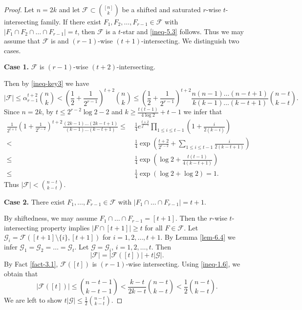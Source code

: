 \documentclass[11pt,a4paper]{article}
\newtheorem{false statement}{False statement}
\theoremstyle{definition}
\def\hf{\mathcal{F}}
\def\hg{\mathcal{G}}
\begin{document}
\begin{proof}
Let $n=2k$ and let $\hf\subset \binom{[n]}{k}$ be a shifted and saturated $r$-wise $t$-intersecting family. If there exist $F_1,F_2,\ldots,F_{r-1}\in \hf$ with $|F_1\cap F_2\cap \ldots \cap F_{r-1}|=t$, then $\hf$ is a $t$-star and \eqref{ineq-5.3} follows. Thus we may assume that $\hf$ is and $(r-1)$-wise $(t+1)$-intersecting.  We distinguish two cases.

\vspace{3pt}
{\noindent\bf Case 1.} $\hf$ is $(r-1)$-wise $(t+2)$-intersecting.
\vspace{3pt}

Then by  \eqref{ineq-key3} we have
\[
 |\hf|\leq \alpha_{r-1}^{t+2}\binom{n}{k}<\left(\frac{1}{2}+\frac{1}{2^{r-1}}\right)^{t+2}\binom{n}{k}\leq \left(\frac{1}{2}+\frac{1}{2^{r-1}}\right)^{t+2}\frac{n(n-1)\ldots(n-t+1)}{k(k-1)\ldots(k-t+1)}\binom{n-t}{k-t}.
\]
Since $n=2k$, by $t\leq 2^{r-2}\log 2 -2$ and $k\geq  \frac{t(t-1)}{4\log 2} +t-1$ we infer that
\begin{align*}
\frac{1}{2^{t+1}}\left(1+\frac{1}{2^{r-2}}\right)^{t+2}\frac{(2k-1)\ldots(2k-t+1)}{(k-1)\ldots(k-t+1)}
\leq \  & \frac{1}{4} e^{\frac{t+2}{2^{r-2}}}\prod_{1\leq i\leq t-1}\left(1+\frac{i}{2(k-i)}\right)\\[2pt]
<\   &\frac{1}{4} \exp\left(\frac{t+2}{2^{r-2}}+\sum_{1\leq i\leq t-1} \frac{i}{2(k-t+1)}\right)\\[2pt]
\leq\   &\frac{1}{4} \exp\left(\log 2+ \frac{t(t-1)}{4(k-t+1)}\right)\\[2pt]
\leq\   &\frac{1}{4} \exp\left(\log 2+ \log 2\right)= 1.
\end{align*}
Thus $|\hf| < \binom{n-t}{k-t}$.

\vspace{3pt}
{\noindent\bf Case 2.} There exist $F_1,\ldots,F_{r-1}\in \hf$ with $|F_1\cap \ldots \cap F_{r-1}|=t+1$.
\vspace{3pt}

By shiftedness, we may assume $F_1\cap \ldots \cap F_{r-1}=[t+1]$.
Then the $r$-wise $t$-intersecting property implies $|F\cap [t+1]|\geq t$ for all $F\in \hf$.  Let $\hg_i= \hf([t+1]\setminus\{i\},[t+1])$ for $i=1,2,\ldots,t+1$. By Lemma \ref{lem-6.4} we infer $\hg_1=\hg_2=\ldots=\hg_t$.
Let $\hg=\hg_i$, $i=1,2,\ldots,t$. Then
\[
|\hf| =|\hf([t])|+ t|\hg|.
\]
 By Fact \ref{fact-3.1},
  $\hf([t])$ is $(r-1)$-wise intersecting. Using \eqref{ineq-1.6}, we obtain that
  \[
  |\hf([t])| \leq \binom{n-t-1}{k-t-1} <\frac{k-t}{2k-t}\binom{n-t}{k-t}<\frac{1}{2}\binom{n-t}{k-t}.
  \]
  We are left to show $t|\hg|\leq \frac{1}{2}\binom{n-t}{k-t}$.


\end{proof}
\end{document}
